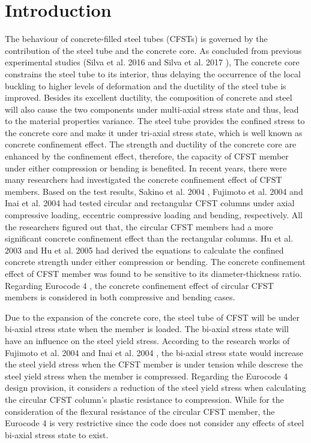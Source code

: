 \documentclass[12pt,a4]{article}
\begin{document}
	\section{Introduction}
	The behaviour of concrete-filled steel tubes (CFSTs) is governed by the contribution of the steel tube and the concrete core. As concluded from previous experimental studies (Silva et al. 2016 \cite{Silva2016} and Silva et al. 2017 \cite{RN140}), The concrete core constrains the steel tube to its interior, thus delaying the occurrence of the local buckling to higher levels of deformation and the ductility of the steel tube is improved. Besides its excellent ductility, the composition of concrete and steel will also cause the two components under multi-axial stress state and thus, lead to the material properties variance. The steel tube provides the confined stress to the concrete core and make it under tri-axial stress state, which is well known as concrete confinement effect. The strength and ductility of the concrete core are enhanced by the confinement effect, therefore, the capacity of CFST member under either compression or bending is benefited. In recent years, there were many researchers had investigated the concrete confinement effect of CFST members. Based on the test results, Sakino et al. 2004 \cite{RN41}, Fujimoto et al. 2004 \cite{RN15} and Inai et al. 2004 \cite{RN30} had tested circular and rectangular CFST columns under axial compressive loading, eccentric compressive loading and bending, respectively. All the researchers figured out that, the circular CFST members had a more significant concrete confinement effect than the rectangular columns. Hu et al. 2003 \cite{RN1} and Hu et al. 2005 \cite{RN29} had derived the equations to calculate the confined concrete strength under either compression or bending. The concrete confinement effect of CFST member was found to be sensitive to its diameter-thickness ratio. Regarding Eurocode 4 \cite{RN64}, the concrete confinement effect of circular CFST members is considered in both compressive and bending cases.
	\par
	Due to the expansion of the concrete core, the steel tube of CFST will be under bi-axial stress state when the member is loaded. The bi-axial stress state will have an influence on the steel yield stress. According to the research works of Fujimoto et al. 2004 \cite{RN15} and Inai et al. 2004 \cite{RN30}, the bi-axial stress state would increase the steel yield stress when the CFST member is under tension while descrese the steel yield stress when the member is compressed. Regarding the Eurocode 4 \cite{RN64} design provision, it considers a reduction of the steel yield stress when calculating the circular CFST column's plastic resistance to compression. While for the consideration of the flexural resistance of the circular CFST member, the Eurocode 4 is very restrictive since the code does not consider any effects of steel bi-axial stress state to exist.
\end{document}
